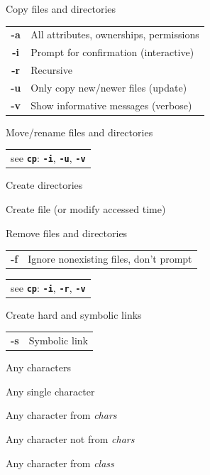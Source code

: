 \documentclass[12pt, a4paper]
{article}
\begin{document}
\begin{multicols}{3}
\begin{description}[nolistsep]
	\item[cp] Copy files and directories
	\item
	\begin{tabular}{cl}
		{\large \ttfamily \textbf{-a}} & All attributes, ownerships, permissions \\
		{\large \ttfamily \textbf{-i}} & Prompt for confirmation (interactive)\\
		{\large \ttfamily \textbf{-r}} & Recursive \\
		{\large \ttfamily \textbf{-u}} & Only copy new/newer files (update) \\
		{\large \ttfamily \textbf{-v}} & Show informative messages (verbose)\\
	\end{tabular}
	\item[mv] Move/rename files and directories
	\item
	\begin{tabular}{l}
		see \texttt{\textbf{cp}}: \texttt{\textbf{-i}}, \texttt{\textbf{-u}}, \texttt{\textbf{-v}}
	\end{tabular}
	\item[mkdir] Create directories
	\item[touch] Create file (or modify accessed time)
	\item[rm] Remove files and directories
	\item
	\begin{tabular}{cl}
		{\large \ttfamily \textbf{-f}} & Ignore nonexisting files, don't prompt
	\end{tabular}
	\item
	\begin{tabular}{l}
		see \texttt{\textbf{cp}}: \texttt{\textbf{-i}}, \texttt{\textbf{-r}}, \texttt{\textbf{-v}}
	\end{tabular}
	\item[ln] Create hard and symbolic links
	\item
	\begin{tabular}{cl}
		{\large \ttfamily \textbf{-s}} & Symbolic link
	\end{tabular}
\end{description}


\begin{description}[nolistsep]
	\item[*] Any characters
	\item[?] Any single character
	\item[{[\large \textit{chars}}{\Large]}] Any character from \textit{chars}
	\item[{[\large!\textit{chars}}{\Large]}] Any character not from \textit{chars}
	\item[{[\large:\textit{class}:}{\Large]}] Any character from \textit{class}
\end{description}


\end{multicols}
\end{document}
